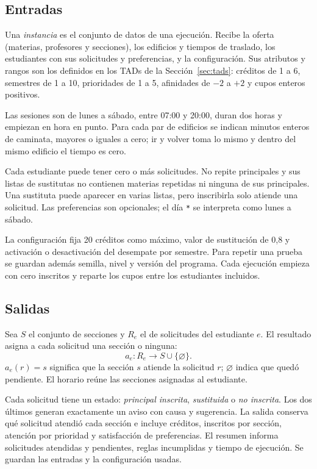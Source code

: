\subsection{Entradas}

Una \emph{instancia} es el conjunto de datos de una ejecución. Recibe la oferta (materias, profesores y secciones), los edificios y tiempos de traslado, los estudiantes con sus solicitudes y preferencias, y la configuración. Sus atributos y rangos son los definidos en los TADs de la Sección~\ref{sec:tads}: créditos de 1 a 6, semestres de 1 a 10, prioridades de 1 a 5, afinidades de $-2$ a $+2$ y cupos enteros positivos.

Las sesiones son de lunes a sábado, entre 07:00 y 20:00, duran dos horas y empiezan en hora en punto. Para cada par de edificios se indican minutos enteros de caminata, mayores o iguales a cero; ir y volver toma lo mismo y dentro del mismo edificio el tiempo es cero.

Cada estudiante puede tener cero o más solicitudes. No repite principales y sus listas de sustitutas no contienen materias repetidas ni ninguna de sus principales. Una sustituta puede aparecer en varias listas, pero inscribirla solo atiende una solicitud. Las preferencias son opcionales; el día \texttt{*} se interpreta como lunes a sábado.

La configuración fija 20 créditos como máximo, valor de sustitución de 0,8 y activación o desactivación del desempate por semestre. Para repetir una prueba se guardan además semilla, nivel y versión del programa. Cada ejecución empieza con cero inscritos y reparte los cupos entre los estudiantes incluidos.

\subsection{Salidas}

Sea $S$ el conjunto de secciones y $R_e$ el de solicitudes del estudiante $e$. El resultado asigna a cada solicitud una sección o ninguna:
\[
a_e:R_e\longrightarrow S\cup\{\varnothing\}.
\]
$a_e(r)=s$ significa que la sección $s$ atiende la solicitud $r$; $\varnothing$ indica que quedó pendiente. El horario reúne las secciones asignadas al estudiante.

Cada solicitud tiene un estado: \emph{principal inscrita}, \emph{sustituida} o \emph{no inscrita}. Los dos últimos generan exactamente un aviso con causa y sugerencia. La salida conserva qué solicitud atendió cada sección e incluye créditos, inscritos por sección, atención por prioridad y satisfacción de preferencias. El resumen informa solicitudes atendidas y pendientes, reglas incumplidas y tiempo de ejecución. Se guardan las entradas y la configuración usadas.

